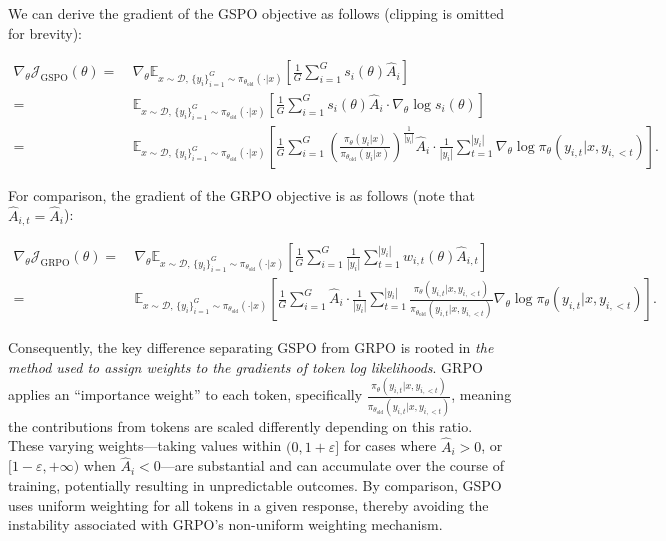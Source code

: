 We can derive the gradient of the GSPO objective as follows (clipping is omitted for brevity):

\begin{align}
\nabla_{\theta} \mathcal{J}_\text{GSPO} (\theta)
=&\ 
\nabla_{\theta} \mathbb{E}_{ x \sim \mathcal{D},\, \{y_i\}_{i=1}^G \sim \pi_{\theta_\text{old}}( \cdot | x) }
\left[ 
\frac{1}{G} \sum_{i=1}^{G} s_{i}(\theta) \widehat{A}_{i}
\right] \\
= &\ 
\mathbb{E}_{ x \sim \mathcal{D},\, \{y_i\}_{i=1}^G \sim \pi_{\theta_\text{old}}( \cdot | x) }
\left[ 
\frac{1}{G} \sum_{i=1}^{G}
s_{i}(\theta) \widehat{A}_{i}
\cdot \nabla_{\theta} \log s_{i}(\theta)
\right] \\
=&\ 
\mathbb{E}_{ x \sim \mathcal{D},\, \{y_i\}_{i=1}^G \sim \pi_{\theta_\text{old}}( \cdot | x) }
\left[ 
\frac{1}{G} \sum_{i=1}^{G} 
\left( \frac{ \pi_{\theta} (y_i | x) }{ \pi_{\theta_\text{old}} (y_i | x)} \right)^{\frac{1}{|y_i|}} \widehat{A}_{i} 
\cdot \frac{1}{|y_i|} \sum_{t=1}^{|y_i|} \nabla_{\theta} \log \pi_{\theta} (y_{i,t} | x, y_{i,<t}) 
\right].
\label{equ:gspo_grad}
\end{align}

For comparison, the gradient of the GRPO objective is as follows (note that $\widehat{A}_{i,t} = \widehat{A}_{i}$):

\begin{align}
\nabla_{\theta} \mathcal{J}_\text{GRPO} (\theta) 
=&\ 
\nabla_{\theta} \mathbb{E}_{ x \sim \mathcal{D},\, \{y_i\}_{i=1}^G \sim \pi_{\theta_\text{old}}( \cdot | x) }
\left[ \frac{1}{G} \sum_{i=1}^{G} \frac{1}{|y_i|} \sum_{t=1}^{|y_i|} 
w_{i,t}(\theta) \widehat{A}_{i,t}
\right] \\
=&\
\mathbb{E}_{ x \sim \mathcal{D},\, \{y_i\}_{i=1}^G \sim \pi_{\theta_\text{old}}( \cdot | x) }
\left[ \frac{1}{G} \sum_{i=1}^{G} \widehat{A}_{i} 
\cdot \frac{1}{|y_i|} \sum_{t=1}^{|y_i|} 
\frac{ \pi_{\theta} (y_{i,t} | x, y_{i,<t}) }{ \pi_{\theta_\text{old}} (y_{i,t} | x,y_{i,<t})} 
\nabla_{\theta} \log \pi_{\theta} (y_{i,t} | x, y_{i,<t})  
\right].
\end{align}

Consequently, the key difference separating GSPO from GRPO is rooted in \textit{the method used to assign weights to the gradients of token log likelihoods}. GRPO applies an ``importance weight'' to each token, specifically $\frac{ \pi_{\theta} (y_{i,t} | x, y_{i,<t}) }{ \pi_{\theta_\text{old}} (y_{i,t} | x,y_{i,<t})}$, meaning the contributions from tokens are scaled differently depending on this ratio. These varying weights—taking values within $(0, 1+\varepsilon]$ for cases where $\widehat{A}_{i} > 0$, or $[1-\varepsilon, +\infty)$ when $\widehat{A}_{i} < 0$—are substantial and can accumulate over the course of training, potentially resulting in unpredictable outcomes. By comparison, GSPO uses uniform weighting for all tokens in a given response, thereby avoiding the instability associated with GRPO's non-uniform weighting mechanism.

